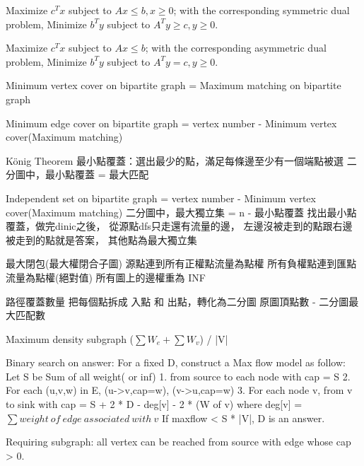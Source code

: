 Maximize $c^{T} x$ subject to $Ax ≤ b, x ≥ 0$;
with the corresponding symmetric dual problem,
Minimize $b^T y$ subject to $A^{T} y ≥ c, y ≥ 0$.

Maximize $c^{T} x$ subject to $Ax ≤ b$;
with the corresponding asymmetric dual problem,
Minimize $b^{T} y$ subject to $A^{T} y = c, y ≥ 0$. 

Minimum vertex cover on bipartite graph =
Maximum matching on bipartite graph

Minimum edge cover on bipartite graph =
vertex number - Minimum vertex cover(Maximum matching)

König Theorem
最小點覆蓋：選出最少的點，滿足每條邊至少有一個端點被選
二分圖中，最小點覆蓋 = 最大匹配

Independent set on bipartite graph =
vertex number - Minimum vertex cover(Maximum matching)
二分圖中，最大獨立集 = n - 最小點覆蓋
找出最小點覆蓋，做完dinic之後，
從源點dfs只走還有流量的邊，
左邊沒被走到的點跟右邊被走到的點就是答案，
其他點為最大獨立集

最大閉包(最大權閉合子圖)
源點連到所有正權點流量為點權
所有負權點連到匯點流量為點權(絕對值)
所有圖上的邊權重為 INF

路徑覆蓋數量
把每個點拆成 入點 和 出點，轉化為二分圖
原圖頂點數 - 二分圖最大匹配數

Maximum density subgraph ($\sum W_e+\sum W_v$) / |V|

Binary search on answer:
For a fixed D, construct a Max flow model as follow:
Let S be Sum of all weight( or inf)
1. from source to each node with cap = S
2. For each (u,v,w) in E, (u->v,cap=w), (v->u,cap=w)
3. For each node v, from v to sink with cap = S + 2 * D - deg[v] - 2 * (W of v)
where deg[v] = $\sum weight\ of\ edge\ associated\ with\ v$
If maxflow < S * |V|, D is an answer.

Requiring subgraph: all vertex can be reached from source with
edge whose cap > 0.